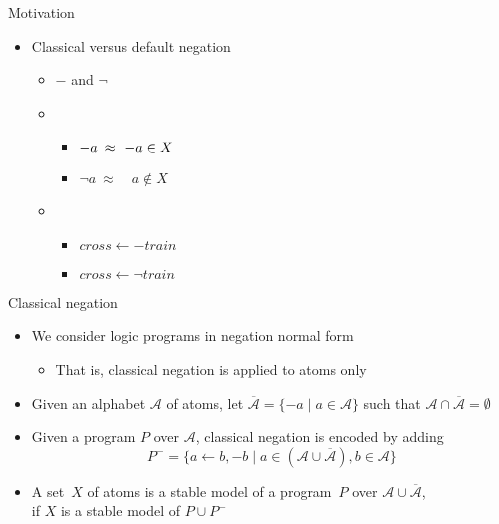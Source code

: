 \begin{frame}[c]{Motivation}
  \begin{itemize}
  \item Classical versus default negation
    \bigskip
    \begin{itemize}\itemsep 1ex
    \item<1->   $-$ and $\neg$
    \item<2-> 
      \begin{itemize}
      \item $\rlap{${-a}$}\phantom{{\neg a}}\ \approx\ {-a}   \in X$
      \item ${\neg a}\ \approx   \quad a\notin X$
      \end{itemize}
    \item<3-> 
      \begin{itemize}
      \item $\mathit{cross}\leftarrow{-\mathit{train}}$
      \item $\mathit{cross}\leftarrow{\neg \mathit{train}}$
      \end{itemize}
    \end{itemize}
  \end{itemize}
\end{frame}
\begin{frame}{Classical negation}
  \begin{itemize}
  \item<1-3> We consider logic programs in negation normal form
    \begin{itemize}
    \item That is, classical negation is applied to atoms only
    \end{itemize}
  \item<2-> Given an alphabet $\mathcal{A}$ of atoms,
    let $\overline{\mathcal{A}}=\{{-a}\mid a\in\mathcal{A}\}$
    such that $\mathcal{A}\cap\overline{\mathcal{A}}=\emptyset$
  \item<3-> Given a program $P$ over $\mathcal{A}$, classical negation is encoded by adding
    \[
    P^-
    =
    \{a \leftarrow b,{-b} \mid a\in(\mathcal{A}\cup\overline{\mathcal{A}}), b\in \mathcal{A}\}
    \]
    \smallskip
  \item<4->
    A set~$X$ of atoms is a \alert{stable model} of a program~$P$
    over $\mathcal{A}\cup\overline{\mathcal{A}}$,
    \\
    if
    $X$ is a stable model of $P\cup P^-$
  \end{itemize}
\end{frame}
